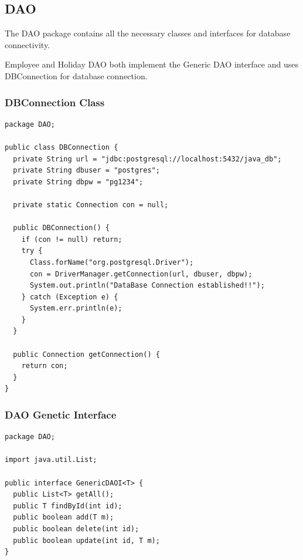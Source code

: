 \documentclass[12pt]{article}
\begin{document}
\pagebreak

\subsection{DAO}

The DAO package contains all the necessary classes and interfaces
for database connectivity.

Employee and Holiday DAO both implement the Generic DAO interface
and uses DBConnection for database connection.

\subsubsection{DBConnection Class}
\begin{lstlisting}
package DAO;

public class DBConnection {
  private String url = "jdbc:postgresql://localhost:5432/java_db";
  private String dbuser = "postgres";
  private String dbpw = "pg1234";

  private static Connection con = null;

  public DBConnection() {
    if (con != null) return;
    try {
      Class.forName("org.postgresql.Driver");
      con = DriverManager.getConnection(url, dbuser, dbpw);
      System.out.println("DataBase Connection established!!");
    } catch (Exception e) {
      System.err.println(e);
    }
  }

  public Connection getConnection() {
    return con;
  }
}
\end{lstlisting}

\subsubsection{DAO Genetic Interface}
\begin{lstlisting}
package DAO;

import java.util.List;

public interface GenericDAOI<T> {
  public List<T> getAll();
  public T findById(int id);
  public boolean add(T m);
  public boolean delete(int id);
  public boolean update(int id, T m);
}
\end{lstlisting}

\pagebreak
\end{document}
